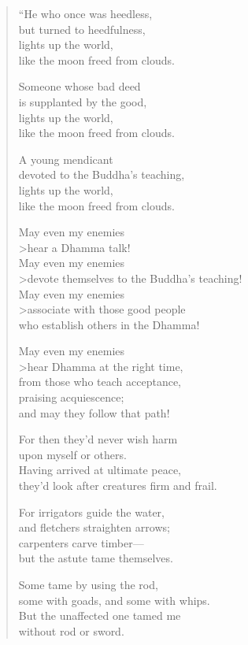 \documentclass[12pt,openany]{book}%
\begin{document}
\begin{verse}
“He who once was heedless, \\
but turned to heedfulness, \\
lights up the world, \\
like the moon freed from clouds. 

Someone whose bad deed \\
is supplanted by the good, \\
lights up the world, \\
like the moon freed from clouds. 

A young mendicant \\
devoted to the Buddha’s teaching, \\
lights up the world, \\
like the moon freed from clouds. 

May even my enemies \\>hear a Dhamma talk! \\
May even my enemies \\>devote themselves to the Buddha’s teaching! \\
May even my enemies \\>associate with those good people \\
who establish others in the Dhamma! 

May even my enemies \\>hear Dhamma at the right time, \\
from those who teach acceptance, \\
praising acquiescence; \\
and may they follow that path! 

For then they’d never wish harm \\
upon myself or others. \\
Having arrived at ultimate peace, \\
they’d look after creatures firm and frail. 

For irrigators guide the water, \\
and fletchers straighten arrows; \\
carpenters carve timber—\\
but the astute tame themselves. 

Some tame by using the rod, \\
some with goads, and some with whips. \\
But the unaffected one tamed me \\
without rod or sword. 


\end{verse}
\end{document}

